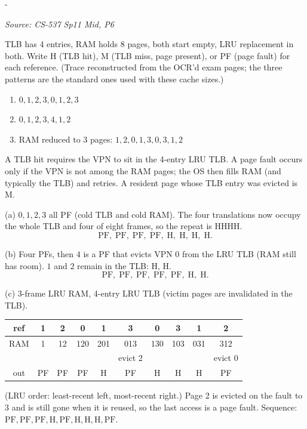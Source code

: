 \documentclass[11pt,a4paper]{article}
\makeatletter
\newcommand{\keepspace}[1]{\par\penalty-100\begingroup
  \setlength{\dimen@}{#1}\dimen@ii\pagegoal\advance\dimen@ii-\pagetotal
  \ifdim\dimen@>\dimen@ii\ifdim\dimen@ii>\z@\vfil\fi\break\fi\endgroup}
\newcounter{qn}[section]
\newenvironment{Qn}[4]{%
  \refstepcounter{qn}\keepspace{7\baselineskip}%
  \begin{tcolorbox}[qboxstyle, title={Q\thesection.\theqn\ \ [#1 \textbar\ #2]\ \ #4}]%
  {\footnotesize\color{g3}\textit{Source: #3}}\par\smallskip%
}{%
  \end{tcolorbox}%
}
\newenvironment{Sol}{%
  \begin{tcolorbox}[sboxstyle, title={Solution}]%
}{%
  \end{tcolorbox}\vspace{0.35em}%
}
\makeatother
\begin{document}
\begin{Qn}{Medium}{Lect 15}{CS-537 Sp11 Mid, P6}{Classify each reference: TLB hit, TLB miss/page hit, or page fault}
TLB has 4 entries, RAM holds 8 pages, both start empty, LRU replacement
in both. Write H (TLB hit), M (TLB miss, page present), or PF (page
fault) for each reference. (Trace reconstructed from the OCR'd exam
pages; the three patterns are the standard ones used with these cache
sizes.)
\begin{enumerate}
  \item[(a)] $0,1,2,3,0,1,2,3$
  \item[(b)] $0,1,2,3,4,1,2$
  \item[(c)] RAM reduced to 3 pages: $1,2,0,1,3,0,3,1,2$
\end{enumerate}
\end{Qn}
\begin{Sol}
A TLB hit requires the VPN to sit in the 4-entry LRU TLB. A page fault
occurs only if the VPN is not among the RAM pages; the OS then fills
RAM (and typically the TLB) and retries. A resident page whose TLB
entry was evicted is M.

(a) $0,1,2,3$ all PF (cold TLB and cold RAM). The four translations
now occupy the whole TLB and four of eight frames, so the repeat is
HHHH.
\[
\mathrm{PF},\;\mathrm{PF},\;\mathrm{PF},\;\mathrm{PF},\;
\mathrm{H},\;\mathrm{H},\;\mathrm{H},\;\mathrm{H}.
\]

(b) Four PFs, then $4$ is a PF that evicts VPN 0 from the LRU TLB
(RAM still has room). $1$ and $2$ remain in the TLB: H, H.
\[
\mathrm{PF},\;\mathrm{PF},\;\mathrm{PF},\;\mathrm{PF},\;
\mathrm{PF},\;\mathrm{H},\;\mathrm{H}.
\]

(c) 3-frame LRU RAM, 4-entry LRU TLB (victim pages are invalidated in
the TLB).
\begin{center}
\small
\begin{tabular}{c|ccccccccc}
ref  & 1 & 2 & 0 & 1 & 3 & 0 & 3 & 1 & 2 \\
\hline
RAM  & 1 & 12& 120& 201& 013& 130& 103& 031& 312 \\
     &   &   &    &    & evict 2 & & & & evict 0 \\
out  & PF& PF& PF & H  & PF & H  & H  & H  & PF \\
\end{tabular}
\end{center}
(LRU order: least-recent left, most-recent right.) Page 2 is evicted on
the fault to 3 and is still gone when it is reused, so the last access
is a page fault. Sequence:
$\mathrm{PF},\mathrm{PF},\mathrm{PF},\mathrm{H},\mathrm{PF},\mathrm{H},\mathrm{H},\mathrm{H},\mathrm{PF}$.
\end{Sol}
\end{document}
